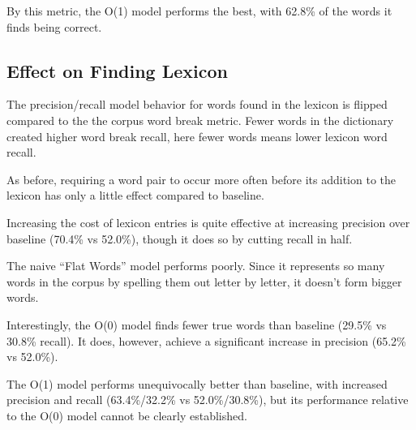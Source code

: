 \documentclass[11pt, oneside, fleqn]{article}
\begin{document}
	By this metric, the O(1) model performs the best, with 62.8\% of the words it finds being correct.

  \subsection{Effect on Finding Lexicon}

	The precision/recall model behavior for words found in the lexicon is flipped compared to the the corpus word break metric. Fewer words in the dictionary created higher word break recall, here fewer words means lower lexicon word recall.

	As before, requiring a word pair to occur more often before its addition to the lexicon has only a little effect compared to baseline.

	Increasing the cost of lexicon entries is quite effective at increasing precision over baseline (70.4\% vs 52.0\%), though it does so by cutting recall in half.

	The naive ``Flat Words'' model performs poorly. Since it represents so many words in the corpus by spelling them out letter by letter, it doesn't form bigger words.

	Interestingly, the O(0) model finds fewer true words than baseline (29.5\% vs 30.8\% recall). It does, however, achieve a significant increase in precision (65.2\% vs 52.0\%).

	The O(1) model performs unequivocally better than baseline, with increased precision and recall (63.4\%/32.2\% vs 52.0\%/30.8\%), but its performance relative to the O(0) model cannot be clearly established.
\end{document}
